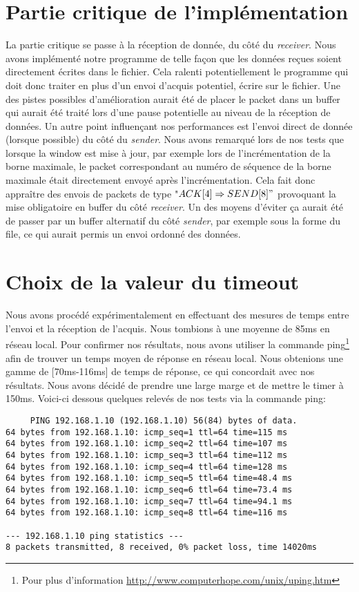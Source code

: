 \documentclass[11pt,a4paper]{article}
\begin{document}
\section{Partie critique de l'implémentation}
La partie critique se passe à la réception de donnée, du côté du \textit{receiver}. Nous avons implémenté notre programme de telle façon que les données reçues soient directement écrites dans le fichier. Cela ralenti potentiellement le programme qui doit donc traiter en plus d'un envoi d'acquis potentiel, écrire sur le fichier. Une des pistes possibles d'amélioration aurait été de placer le packet dans un buffer qui aurait été traité lors d'une pause potentielle au niveau de la réception de données. Un autre point influençant nos performances est l'envoi direct de donnée (lorsque possible) du côté du \textit{sender}. Nous avons remarqué lors de nos tests que lorsque la window est mise à jour, par exemple lors de l'incrémentation de la borne maximale, le packet correspondant au numéro de séquence de la borne maximale était directement envoyé après l'incrémentation. Cela fait donc appraître des envois de packets de type "$ACK[4]\Rightarrow SEND[8]"$ provoquant la mise obligatoire en buffer du côté \textit{receiver}. Un des moyens d'éviter ça aurait été de passer par un buffer alternatif du côté \textit{sender}, par exemple sous la forme du file, ce qui aurait permis un envoi ordonné des données. 

\section{Choix de la valeur du timeout}
Nous avons procédé expérimentalement en effectuant des mesures de temps entre l'envoi et la réception de l'acquis. Nous tombions à une moyenne de 85ms en réseau local. Pour confirmer nos résultats, nous avons utiliser la commande ping\footnote{Pour plus d'information \url{http://www.computerhope.com/unix/uping.htm}} afin de trouver un temps moyen de réponse en réseau local. Nous obtenions une gamme de [70ms-116ms] de temps de réponse, ce qui concordait avec nos résultats. Nous avons décidé de prendre une large marge et de mettre le timer à 150ms. Voici-ci dessous quelques relevés de nos tests via la commande ping: 

\begin{lstlisting}
     PING 192.168.1.10 (192.168.1.10) 56(84) bytes of data.
64 bytes from 192.168.1.10: icmp_seq=1 ttl=64 time=115 ms
64 bytes from 192.168.1.10: icmp_seq=2 ttl=64 time=107 ms
64 bytes from 192.168.1.10: icmp_seq=3 ttl=64 time=112 ms
64 bytes from 192.168.1.10: icmp_seq=4 ttl=64 time=128 ms
64 bytes from 192.168.1.10: icmp_seq=5 ttl=64 time=48.4 ms
64 bytes from 192.168.1.10: icmp_seq=6 ttl=64 time=73.4 ms
64 bytes from 192.168.1.10: icmp_seq=7 ttl=64 time=94.1 ms
64 bytes from 192.168.1.10: icmp_seq=8 ttl=64 time=116 ms

--- 192.168.1.10 ping statistics ---
8 packets transmitted, 8 received, 0% packet loss, time 14020ms

\end{lstlisting}
\end{document}
